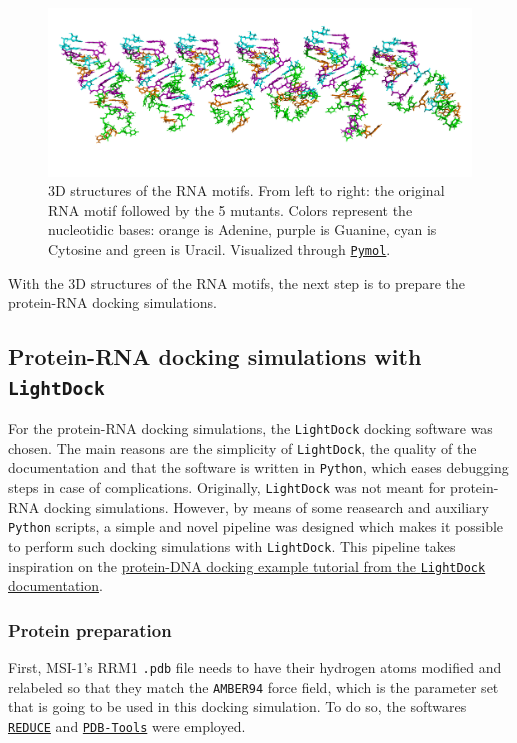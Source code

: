 \begin{figure}[htbp!]
    \centering
    \includegraphics[width=\linewidth]{assets/RNAs.png}
    \caption[3D structures of the RNA motifs.]{3D structures of the RNA motifs. From left to right: the original RNA motif followed by the 5 mutants. Colors represent the nucleotidic bases: orange is Adenine, purple is Guanine, cyan is Cytosine and green is Uracil. Visualized through \href{https://pymol.org/2/}{\texttt{Pymol}}.}
    \label{fig:RNAs}
\end{figure}

With the 3D structures of the RNA motifs, the next step is to prepare the protein-RNA docking simulations.

\subsection{Protein-RNA docking simulations with \texttt{LightDock}}

For the protein-RNA docking simulations, the \texttt{LightDock} \cite{jimenez_garcia_2017} docking software was chosen. The main reasons are the simplicity of \texttt{LightDock}, the quality of the documentation and that the software is written in \texttt{Python}, which eases debugging steps in case of complications. Originally, \texttt{LightDock} was not meant for protein-RNA docking simulations. However, by means of some reasearch and auxiliary \texttt{Python} scripts, a simple and novel pipeline was designed which makes it possible to perform such docking simulations with \texttt{LightDock}. This pipeline takes inspiration on the \href{https://lightdock.org/tutorials/0.9.3/dna_docking}{protein-DNA docking example tutorial from the \texttt{LightDock} documentation}.

\subsubsection{Protein preparation}

First, MSI-1's RRM1 \texttt{.pdb} file needs to have their hydrogen atoms modified and relabeled so that they match the \texttt{AMBER94} force field, which is the parameter set that is going to be used in this docking simulation. To do so, the softwares \href{https://github.com/rlabduke/reduce}{\texttt{REDUCE}} and \href{https://github.com/haddocking/pdb-tools/}{\texttt{PDB-Tools}} \cite{rodrigues_2018} were employed.\\

